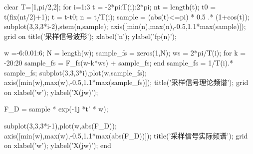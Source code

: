 \documentclass[]{article}
\newenvironment{Shaded}{}{}
\newcommand{\FloatTok}[1]{\textcolor[rgb]{0.25,0.63,0.44}{#1}}
\newcommand{\NormalTok}[1]{#1}
\newcommand{\StringTok}[1]{\textcolor[rgb]{0.25,0.44,0.63}{#1}}
\begin{document}
\begin{Shaded}
\begin{Highlighting}[]
\NormalTok{clear}
\NormalTok{T=[}\FloatTok{1}\NormalTok{,pi/}\FloatTok{2}\NormalTok{,}\FloatTok{2}\NormalTok{];}
\NormalTok{for i=}\FloatTok{1}\NormalTok{:}\FloatTok{3}
\NormalTok{t = -}\FloatTok{2}\NormalTok{*pi:T(i):}\FloatTok{2}\NormalTok{*pi;}
\NormalTok{nt = length(t);}
\NormalTok{t0 = t(fix(nt/}\FloatTok{2}\NormalTok{)+}\FloatTok{1}\NormalTok{);}
\NormalTok{t = t-t0;}
\NormalTok{n = t/T(i);}
\NormalTok{sample = (abs(t)<=pi) * }\FloatTok{0.5}\NormalTok{ .* (}\FloatTok{1}\NormalTok{+cos(t));}
\NormalTok{subplot(}\FloatTok{3}\NormalTok{,}\FloatTok{3}\NormalTok{,}\FloatTok{3}\NormalTok{*i-}\FloatTok{2}\NormalTok{),stem(n,sample);}
\NormalTok{axis([min(n),max(n),-}\FloatTok{0.5}\NormalTok{,}\FloatTok{1.1}\NormalTok{*max(sample)]);  }
\NormalTok{grid on}
\NormalTok{title(}\StringTok{'采样信号波形'}\NormalTok{);}
\NormalTok{xlabel(}\StringTok{'n'}\NormalTok{);}
\NormalTok{ylabel(}\StringTok{'fp(n)'}\NormalTok{);}

\NormalTok{w =-}\FloatTok{6}\NormalTok{:}\FloatTok{0.01}\NormalTok{:}\FloatTok{6}\NormalTok{;}
\NormalTok{N = length(w);}
\NormalTok{sample_fs = zeros(}\FloatTok{1}\NormalTok{,N);}
\NormalTok{ws = }\FloatTok{2}\NormalTok{*pi/T(i);}
\NormalTok{    for k = -}\FloatTok{20}\NormalTok{:}\FloatTok{20}
\NormalTok{        sample_fs = F_fs(w-k*ws) + sample_fs;}
\NormalTok{    end}
\NormalTok{sample_fs = }\FloatTok{1}\NormalTok{/T(i).* sample_fs;}
\NormalTok{subplot(}\FloatTok{3}\NormalTok{,}\FloatTok{3}\NormalTok{,}\FloatTok{3}\NormalTok{*i),plot(w,sample_fs);}
\NormalTok{axis([min(w),max(w),-}\FloatTok{0.5}\NormalTok{,}\FloatTok{1.1}\NormalTok{*max(sample_fs)]);  }
\NormalTok{title(}\StringTok{'采样信号理论频谱'}\NormalTok{);}
\NormalTok{grid on}
\NormalTok{xlabel(}\StringTok{'w'}\NormalTok{);}
\NormalTok{ylabel(}\StringTok{'X(jw)'}\NormalTok{);}
  
\NormalTok{F_D = sample * exp(-}\FloatTok{1j}\NormalTok{ *t' * w);}

\NormalTok{subplot(}\FloatTok{3}\NormalTok{,}\FloatTok{3}\NormalTok{,}\FloatTok{3}\NormalTok{*i-}\FloatTok{1}\NormalTok{),plot(w,abs(F_D));}
\NormalTok{axis([min(w),max(w),-}\FloatTok{0.5}\NormalTok{,}\FloatTok{1.1}\NormalTok{*max(abs(F_D))]); }
\NormalTok{title(}\StringTok{'采样信号实际频谱'}\NormalTok{);}
\NormalTok{grid on}
\NormalTok{xlabel(}\StringTok{'w'}\NormalTok{);}
\NormalTok{ylabel(}\StringTok{'X(jw)'}\NormalTok{);}
\NormalTok{end}
\end{Highlighting}
\end{Shaded}
\end{document}
